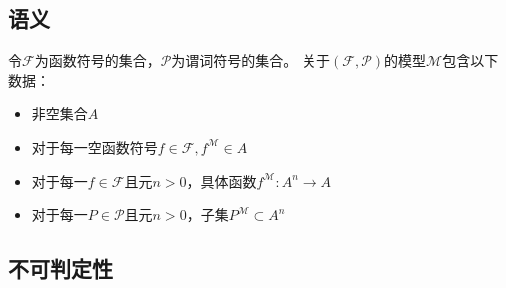 \subsection{语义}
\begin{definition}[模型(model)]
令$\mathcal{F}$为函数符号的集合，$\mathcal{P}$为谓词符号的集合。
关于$(\mathcal{F},\mathcal{P})$的模型$\mathcal{M}$包含以下数据：
\begin{itemize}
	\item 非空集合$A$
	\item 对于每一空函数符号$f\in\mathcal{F},f^{\mathcal{M}}\in A$
	\item 对于每一$f\in\mathcal{F}$且元$n>0$，具体函数$f^{\mathcal{M}}:A^n\to A$
	\item 对于每一$P\in\mathcal{P}$且元$n>0$，子集$P^\mathcal{M}\subset A^n$
\end{itemize}
\end{definition}

\subsection{不可判定性}
